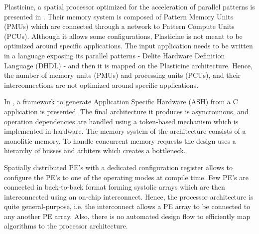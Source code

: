 Plasticine, a spatial processor optimized for the acceleration of parallel patterns is presented in \cite{prabhakar2017plasticine}. Their memory system is composed of Pattern Memory Units (PMUs) which are connected through a network to Pattern Compute Units (PCUs). Although it allows some configurations, Plasticine is not meant to be optimized around specific applications. The input application needs to be written in a language exposing its parallel patterns - Delite Hardware Definition Language (DHDL) - and then it is mapped on the Plasticine architecture. Hence, the number of memory units (PMUs) and processing units (PCUs), and their interconnections are not optimized around specific applications.

In \cite{budiu2004spatial}, a framework to generate Application Specific Hardware (ASH) from a C application is presented. The final architecture it produces is asyncrounous, and operation dependencies are handled using a token-based mechanism which is implemented in hardware. The memory system of the architecture consists of a monolitic memory. To handle concurrent memory requests the design uses a hierarchy of busses and arbiters which creates a bottleneck.

Spatially distributed PE's with a dedicated configuration register allows to configure the PE's to one of the operating modes \cite{streamproc2019} at compile time. Few PE's are connected in back-to-back format forming systolic arrays which are then interconnected using an on-chip interconnect. Hence, the processor architecture is quite general-purpose, i.e, the interconnect allows a PE array to be connected to any another PE array. Also, there is no automated design flow to efficiently map algorithms to the processor architecture.
